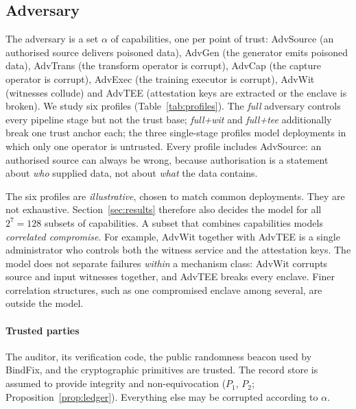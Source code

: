 \subsection{Adversary}

The adversary is a set $\alpha$ of capabilities, one per point of trust:
\textsf{AdvSource} (an authorised source delivers poisoned data),
\textsf{AdvGen} (the generator emits poisoned data),
\textsf{AdvTrans} (the transform operator is corrupt),
\textsf{AdvCap} (the capture operator is corrupt),
\textsf{AdvExec} (the training executor is corrupt),
\textsf{AdvWit} (witnesses collude) and
\textsf{AdvTEE} (attestation keys are extracted or the enclave is broken).
We study six profiles (Table~\ref{tab:profiles}). The \emph{full} adversary controls every
pipeline stage but not the trust base; \emph{full+wit} and \emph{full+tee} additionally break
one trust anchor each; the three single-stage profiles model deployments in which only one
operator is untrusted. Every profile includes \textsf{AdvSource}: an authorised source can
always be wrong, because authorisation is a statement about \emph{who} supplied data, not
about \emph{what} the data contains.

The six profiles are \emph{illustrative}, chosen to match common deployments. They are not
exhaustive. Section~\ref{sec:results} therefore also decides the model for all $2^7=128$
subsets of capabilities. A subset that combines capabilities models \emph{correlated
compromise}. For example, \textsf{AdvWit} together with \textsf{AdvTEE} is a single
administrator who controls both the witness service and the attestation keys. The model
does not separate failures \emph{within} a mechanism class: \textsf{AdvWit} corrupts source
and input witnesses together, and \textsf{AdvTEE} breaks every enclave. Finer correlation
structures, such as one compromised enclave among several, are outside the model.

\paragraph{Trusted parties}
The auditor, its verification code, the public randomness beacon used by
\textsf{BindFix}, and the cryptographic primitives are trusted. The record store is assumed
to provide integrity and non-equivocation ($P_1$, $P_2$; Proposition~\ref{prop:ledger}).
Everything else may be corrupted according to $\alpha$.

